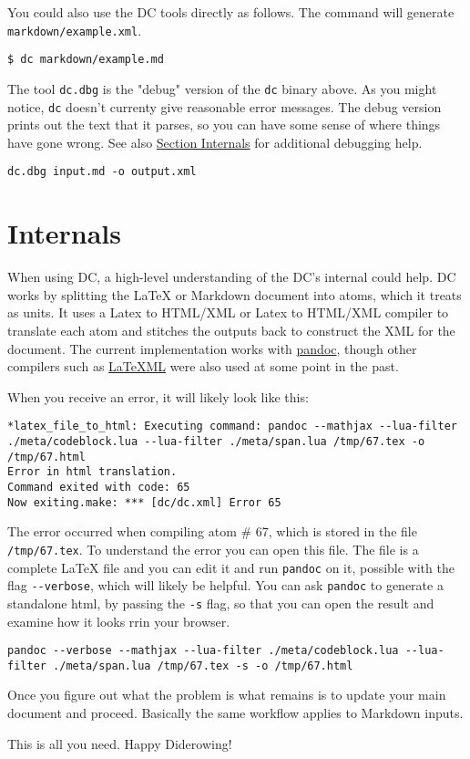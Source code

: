 \begin{gram}
You could also use the DC tools directly as follows.
%
The command will generate  \lstinline`markdown/example.xml`.

\begin{lstlisting}
$ dc markdown/example.md
\end{lstlisting}

\end{gram}

\begin{gram} 
The tool \lstinline`dc.dbg` is the "debug" version of the \lstinline`dc` binary above. As you might notice, \lstinline`dc` doesn't currenty give reasonable error messages.  The debug version prints out the text that it parses, so you can have some sense of where things have gone wrong. 
See also \href{sec:dc::internals}{Section Internals} for additional debugging help.
\begin{lstlisting}
dc.dbg input.md -o output.xml
\end{lstlisting}
\end{gram}

\section{Internals}
\label{sec:dc::internals}

When using DC, a high-level understanding of the DC's internal could help.
%
DC works by splitting the LaTeX or Markdown document into atoms, which it treats as units.
%
It uses a Latex to HTML/XML or Latex to HTML/XML compiler to translate each atom and stitches the outputs back to construct the XML for the document.
%
The current implementation works with \href{https://www.pandoc.org}{pandoc}, though other compilers such as \href{https://dlmf.nist.gov/LaTeXML/}{LaTeXML} were also used at some point in the past.

When you receive an error, it will likely look like this:
\begin{lstlisting}
*latex_file_to_html: Executing command: pandoc --mathjax --lua-filter ./meta/codeblock.lua --lua-filter ./meta/span.lua /tmp/67.tex -o /tmp/67.html
Error in html translation.
Command exited with code: 65
Now exiting.make: *** [dc/dc.xml] Error 65
\end{lstlisting} 
% 
The error occurred when compiling atom \# 67, which is stored in the file \lstinline`/tmp/67.tex`.
%
To understand the error you can open this file.  The file is a complete LaTeX file and you can edit it and run \lstinline`pandoc` on it, possible with the flag \lstinline`--verbose`, which will likely be helpful.
%
You can ask \lstinline`pandoc` to generate a standalone html, by passing the \lstinline`-s` flag, so that you can open the result and examine how it looks rrin your browser.
%
\begin{lstlisting}
pandoc --verbose --mathjax --lua-filter ./meta/codeblock.lua --lua-filter ./meta/span.lua /tmp/67.tex -s -o /tmp/67.html
\end{lstlisting}
%
Once you figure out what the problem is what remains is to update your main document and proceed.
%
Basically the same workflow applies to Markdown inputs.

This is all you need. Happy Diderowing!
